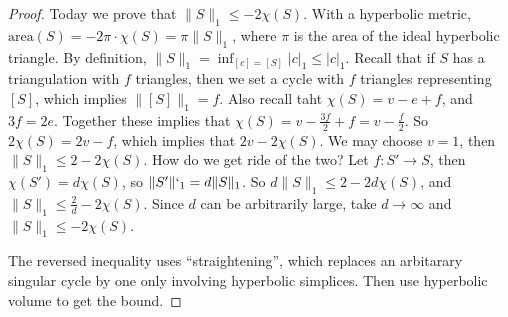 \begin{proof}
    Today we prove that $\|S\|_1 \leq -2\chi(S)$. With a hyperbolic metric, $\mathrm{area}(S)=-2\pi \cdot \chi(S)= \pi \| S\|_1$, where $\pi$ is the area of the ideal hyperbolic triangle. By definition, $\|S\|_1= \inf_{[c]=[S]} |c|_1\leq |c|_1$. Recall that if $S$ has a triangulation with $f$ triangles, then we set a cycle with $f$ triangles representing $[S]$, which implies $\|[S]\|_1=f$. Also recall taht $\chi(S)=v-e+f$, and $3f=2e$. Together these implies that $\chi(S)=v-\frac{3f}{2}+f=v-\frac{f}{2}$. So $2\chi(S)=2v-f$, which implies that $2v-2\chi(S)$. We may choose $v=1$, then $\|S\|_1\leq 2-2\chi(S)$. How do we get ride of the two? Let $f \colon S' \to S$, then $\chi(S')=d\chi(S)$, so $\|S'\|`_1=d\| S\|_1$. So $d \|S\|_1 \leq 2-2d \chi(S)$, and $\|S\|_1 \leq \frac{2}{d}-2\chi(S)$. Since $d$ can be arbitrarily large, take $d \to \infty$ and $\| S\|_1 \leq -2\chi(S)$.

    The reversed inequality uses ``straightening'', which replaces an arbitarary singular cycle by one only involving hyperbolic simplices. Then use hyperbolic volume to get the bound.
\end{proof}
